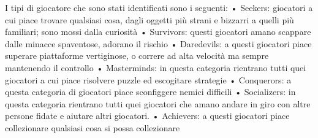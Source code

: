 I tipi di giocatore che sono stati identificati sono i seguenti:
• Seekers: giocatori a cui piace trovare qualsiasi cosa, dagli oggetti più strani e bizzarri a quelli più familiari; sono mossi dalla curiosità
• Survivors: questi giocatori amano scappare dalle minacce spaventose, adorano il rischio
• Daredevils: a questi giocatori piace superare piattaforme vertiginose, o correre ad alta velocità ma sempre mantenendo il controllo
• Masterminds: in questa categoria rientrano tutti quei giocatori a cui piace risolvere puzzle ed escogitare strategie
• Conquerors: a questa categoria di giocatori piace sconfiggere nemici difficili
• Socializers: in questa categoria rientrano tutti quei giocatori che amano andare in giro con altre persone fidate e aiutare altri giocatori.
• Achievers: a questi giocatori piace collezionare qualsiasi cosa si possa collezionare

